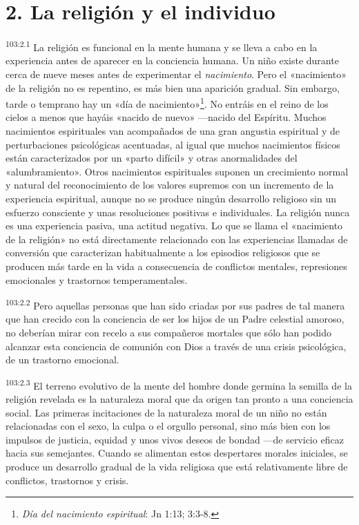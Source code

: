 \section*{2. La religión y el individuo}
\par
\textsuperscript{103:2.1} La religión es funcional en la mente humana y se lleva a cabo en la experiencia antes de aparecer en la conciencia humana. Un niño existe durante cerca de nueve meses antes de experimentar el \textit{nacimiento}. Pero el «nacimiento» de la religión no es repentino, es más bien una aparición gradual. Sin embargo, tarde o temprano hay un «día de nacimiento»\footnote{\textit{Día del nacimiento espiritual}: Jn 1:13; 3:3-8.}. No entráis en el reino de los cielos a menos que hayáis «nacido de nuevo» ---nacido del Espíritu. Muchos nacimientos espirituales van acompañados de una gran angustia espiritual y de perturbaciones psicológicas acentuadas, al igual que muchos nacimientos físicos están caracterizados por un «parto difícil» y otras anormalidades del «alumbramiento». Otros nacimientos espirituales suponen un crecimiento normal y natural del reconocimiento de los valores supremos con un incremento de la experiencia espiritual, aunque no se produce ningún desarrollo religioso sin un esfuerzo consciente y unas resoluciones positivas e individuales. La religión nunca es una experiencia pasiva, una actitud negativa. Lo que se llama el «nacimiento de la religión» no está directamente relacionado con las experiencias llamadas de conversión que caracterizan habitualmente a los episodios religiosos que se producen más tarde en la vida a consecuencia de conflictos mentales, represiones emocionales y trastornos temperamentales.

\par
\textsuperscript{103:2.2} Pero aquellas personas que han sido criadas por sus padres de tal manera que han crecido con la conciencia de ser los hijos de un Padre celestial amoroso, no deberían mirar con recelo a sus compañeros mortales que sólo han podido alcanzar esta conciencia de comunión con Dios a través de una crisis psicológica, de un trastorno emocional.

\par
\textsuperscript{103:2.3} El terreno evolutivo de la mente del hombre donde germina la semilla de la religión revelada es la naturaleza moral que da origen tan pronto a una conciencia social. Las primeras incitaciones de la naturaleza moral de un niño no están relacionadas con el sexo, la culpa o el orgullo personal, sino más bien con los impulsos de justicia, equidad y unos vivos deseos de bondad ---de servicio eficaz hacia sus semejantes. Cuando se alimentan estos despertares morales iniciales, se produce un desarrollo gradual de la vida religiosa que está relativamente libre de conflictos, trastornos y crisis.

